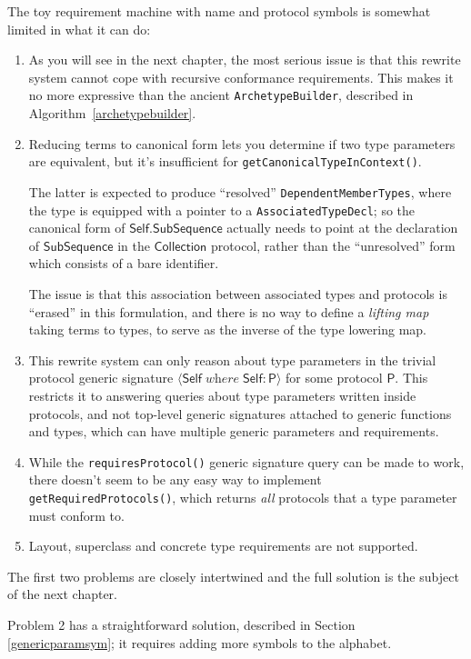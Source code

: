 \documentclass[a4paper,headsepline,bibliography=totoc,toc=flat,fleqn,twoside=semi]{scrbook}
\theoremstyle{definition}
\theoremstyle{definition}
\theoremstyle{definition}
\newcommand{\namesym}[1]{\mathsf{#1}}
\newcommand{\genericparam}[1]{\bm{\mathsf{#1}}}
\newcommand{\proto}[1]{\bm{\mathsf{#1}}}
\newcommand{\gensig}[2]{\langle #1\;\textit{where}\;#2\rangle}
\begin{document}
The toy requirement machine with name and protocol symbols is somewhat limited in what it can do:
\begin{enumerate}
\item As you will see in the next chapter, the most serious issue is that this rewrite system cannot cope with recursive conformance requirements. This makes it no more expressive than the ancient \texttt{ArchetypeBuilder}, described in Algorithm~\ref{archetypebuilder}.

\item Reducing terms to canonical form lets you determine if two type parameters are equivalent, but it's insufficient for \texttt{getCanonicalTypeInContext()}.

The latter is expected to produce ``resolved'' \texttt{DependentMemberTypes}, where the type is equipped with a pointer to a \texttt{AssociatedTypeDecl}; so the canonical form of $\genericparam{Self}.\namesym{SubSequence}$ actually needs to point at the declaration of $\namesym{SubSequence}$ in the $\proto{Collection}$ protocol, rather than the ``unresolved'' form which consists of a bare identifier.

The issue is that this association between associated types and protocols is ``erased'' in this formulation, and there is no way to define a \emph{lifting map} taking terms to types, to serve as the inverse of the type lowering map.

\item This rewrite system can only reason about type parameters in the trivial protocol generic signature $\gensig{\genericparam{Self}}{\genericparam{Self}\colon\proto{P}}$ for some protocol $\proto{P}$. This restricts it to answering queries about type parameters written inside protocols, and not top-level generic signatures attached to generic functions and types, which can have multiple generic parameters and requirements.
\item While the \texttt{requiresProtocol()} generic signature query can be made to work, there doesn't seem to be any easy way to implement \texttt{getRequiredProtocols()}, which returns \emph{all} protocols that a type parameter must conform to.
\item Layout, superclass and concrete type requirements are not supported.
\end{enumerate}

The first two problems are closely intertwined and the full solution is the subject of the next chapter. 

Problem 2 has a straightforward solution, described in Section \ref{genericparamsym}; it requires adding more symbols to the alphabet.
\end{document}
